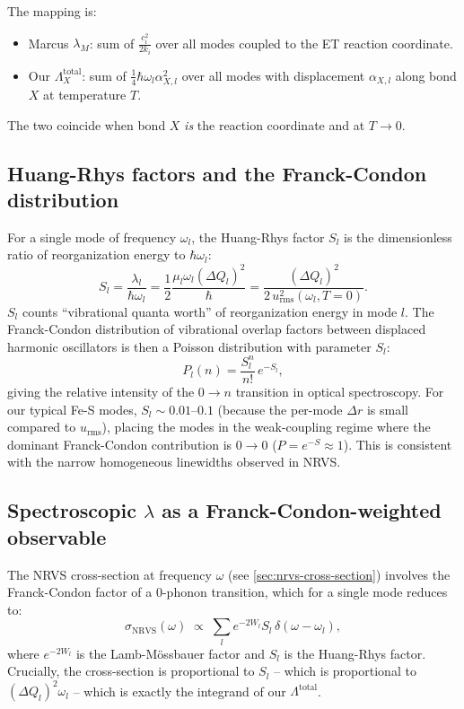 \documentclass[10pt,a4paper,twoside]{article}
\newcommand{\urms}{u_{\mathrm{rms}}}
\begin{document}
The mapping is:
\begin{itemize}
  \item Marcus $\lambda_M$: sum of $\tfrac{c_i^2}{2 k_i}$ over all
        modes coupled to the ET reaction coordinate.
  \item Our $\Lambda_X^\text{total}$: sum of $\tfrac{1}{4}\hbar
        \omega_l \alpha_{X,l}^2$ over all modes with displacement
        $\alpha_{X,l}$ along bond $X$ at temperature $T$.
\end{itemize}
The two coincide when bond $X$ \emph{is} the reaction coordinate
and at $T \to 0$.

\subsection{Huang-Rhys factors and the Franck-Condon distribution}

For a single mode of frequency $\omega_l$, the Huang-Rhys factor
$S_l$ is the dimensionless ratio of reorganization energy to
$\hbar\omega_l$:
\begin{equation}
  S_l = \frac{\lambda_l}{\hbar\omega_l}
      = \frac{1}{2}\frac{\mu_l\omega_l(\Delta Q_l)^2}{\hbar}
      = \frac{(\Delta Q_l)^2}{2\,\urms^2(\omega_l, T = 0)}.
\end{equation}
$S_l$ counts ``vibrational quanta worth'' of reorganization energy
in mode $l$. The Franck-Condon distribution of vibrational
overlap factors between displaced harmonic oscillators is then a
Poisson distribution with parameter $S_l$:
\begin{equation}
  P_l(n) = \frac{S_l^n}{n!}\,e^{-S_l},
\end{equation}
giving the relative intensity of the $0 \to n$ transition in
optical spectroscopy. For our typical Fe-S modes,
$S_l \sim 0.01$--$0.1$ (because the per-mode $\Delta r$ is small
compared to $\urms$), placing the modes in the weak-coupling
regime where the dominant Franck-Condon contribution is
$0 \to 0$ ($P = e^{-S} \approx 1$). This is consistent with the
narrow homogeneous linewidths observed in NRVS.

\subsection{Spectroscopic $\lambda$ as a Franck-Condon-weighted observable}

The NRVS cross-section at frequency $\omega$ (see
\cref{sec:nrvs-cross-section}) involves the Franck-Condon factor
of a 0-phonon transition, which for a single mode reduces to:
\begin{equation}
  \sigma_\text{NRVS}(\omega) \;\propto\; \sum_l e^{-2W_l}
                                          S_l\,\delta(\omega - \omega_l),
\end{equation}
where $e^{-2W_l}$ is the Lamb-Mössbauer factor and $S_l$ is the
Huang-Rhys factor. Crucially, the cross-section is proportional
to $S_l$ -- which is proportional to $(\Delta Q_l)^2 \omega_l$ --
which is exactly the integrand of our $\Lambda^\text{total}$.
\end{document}
